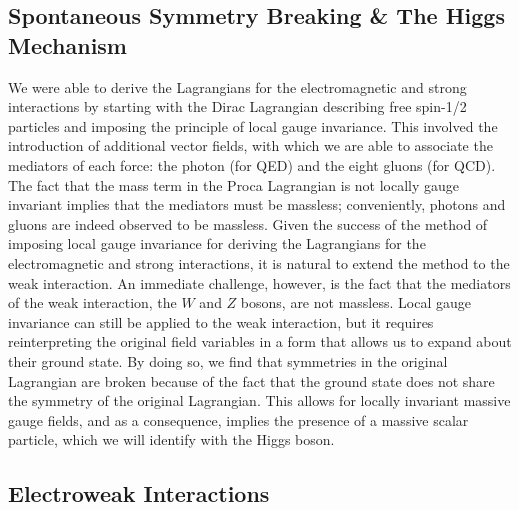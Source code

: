 \subsection{Spontaneous Symmetry Breaking \& The Higgs Mechanism} \label{sec:theory_ssbhm} 
We were able to derive the Lagrangians for the electromagnetic and strong interactions by starting with the Dirac Lagrangian describing free spin-1/2 particles and imposing the principle of local gauge invariance.
This involved the introduction of additional vector fields, with which we are able to associate the mediators of each force: the photon (for QED) and the eight gluons (for QCD).
The fact that the mass term in the Proca Lagrangian is not locally gauge invariant implies that the mediators must be massless; conveniently, photons and gluons are indeed observed to be massless.
Given the success of the method of imposing local gauge invariance for deriving the Lagrangians for the electromagnetic and strong interactions, it is natural to extend the method to the weak interaction.
An immediate challenge, however, is the fact that the mediators of the weak interaction, the $W$ and $Z$ bosons, are not massless.
Local gauge invariance can still be applied to the weak interaction, but it requires reinterpreting the original field variables in a form that allows us to expand about their ground state.
By doing so, we find that symmetries in the original Lagrangian are broken because of the fact that the ground state does not share the symmetry of the original Lagrangian.
This allows for locally invariant massive gauge fields, and as a consequence, implies the presence of a massive scalar particle, which we will identify with the Higgs boson.

\subsection{Electroweak Interactions} \label{sec:theory_ewk}

